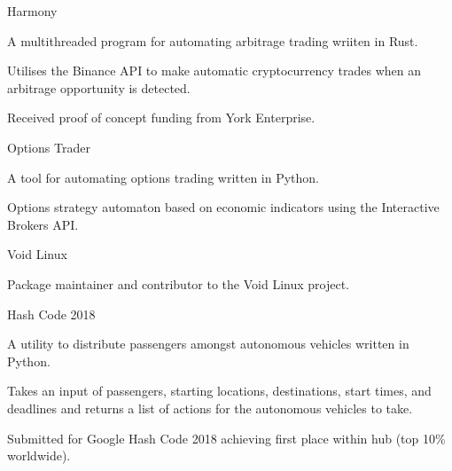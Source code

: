 
\begin{cventries}
  \cventry
    {} %
    {Harmony} %
    {} %
    {} %
    {
      \begin{cvitems} %
        \item {A multithreaded program for automating arbitrage trading wriiten in Rust.}
        \vspace{0.5mm}
		\item {Utilises the Binance API to make automatic cryptocurrency trades when an arbitrage opportunity is detected.}
		\vspace{0.5mm}
		\item {Received proof of concept funding from York Enterprise.}
      \end{cvitems}
    }

  \cventry
    {} %
    {Options Trader} %
    {} %
    {} %
    {
      \begin{cvitems} %
        \item {A tool for automating options trading written in Python.}
        \vspace{0.5mm}
		\item {Options strategy automaton based on economic indicators using the Interactive Brokers API.}
      \end{cvitems}
    }

  \cventry
    {} %
    {Void Linux} %
    {} %
    {} %
    {
      \begin{cvitems} %
      	\item {Package maintainer and contributor to the Void Linux project.}
      \end{cvitems}
    }

  \cventry
    {} %
    {Hash Code 2018} %
    {} %
    {} %
    {
      \begin{cvitems} %
      	\item {A utility to distribute passengers amongst autonomous vehicles written in Python.}
      	\vspace{0.5mm}
		\item {Takes an input of passengers, starting locations, destinations, start times, and deadlines and returns a list of actions for the autonomous vehicles to take.}
		\vspace{0.5mm}
		\item {Submitted for Google Hash Code 2018 achieving first place within hub (top 10\% worldwide).}
      \end{cvitems}
    }
\end{cventries}